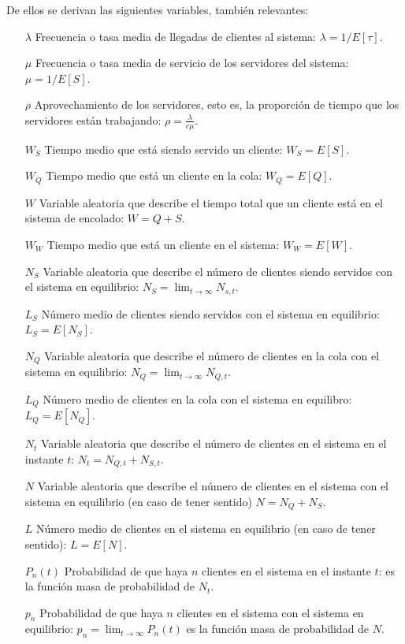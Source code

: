 \documentclass[a4paper,10pt]{scrartcl}
\theoremstyle{definition}
\numberwithin{equation}{section}
\begin{document}

De ellos se derivan las siguientes variables, también relevantes:
\begin{itemize}
\item [$\lambda$]
  Frecuencia o tasa media de llegadas de clientes al sistema: $\lambda = 1/E[\tau]$.
\item [$\mu$]
  Frecuencia o tasa media de servicio de los servidores del sistema: $\mu = 1/E[S]$.
\item [$\rho$]
  Aprovechamiento de los servidores, esto es, la proporción de tiempo que los servidores están trabajando: $\rho = \frac{\lambda}{c\mu}$.
\item [$W_S$]
  Tiempo medio que está siendo servido un cliente: $W_S  = E[S]$.
\item [$W_Q$]
  Tiempo medio que está un cliente en la cola: $W_Q = E[Q]$.
\item [$W$]
  Variable aleatoria que describe el tiempo total que un cliente está en el sistema de encolado: $W = Q+S$.
\item [$W_W$]
  Tiempo medio que está un cliente en el sistema: $W_W = E[W]$.
\item [$N_S$]
  Variable aleatoria que describe el número de clientes siendo servidos con el sistema en equilibrio: $N_S = \lim_{t \rightarrow \infty} N_{s,t}$.
\item [$L_S$]
  Número medio de clientes siendo servidos con el sistema en equilibrio: \\ $L_S = E[N_S]$.
\item [$N_Q$]
  Variable aleatoria que describe el número de clientes en la cola con el sistema en equilibrio: $N_Q = \lim_{t \rightarrow \infty} N_{Q,t}$.
\item [$L_Q$]
  Número medio de clientes en la cola con el sistema en equilibro: $L_Q = E[N_Q]$.
\item [$N_t$]
  Variable aleatoria que describe el número de clientes en el sistema en el instante $t$: $N_t = N_{Q,t} + N_{S,t}$.
\item [$N$]
  Variable aleatoria que describe el número de clientes en el sistema con el sistema en equilibrio (en caso de tener sentido) $N = N_Q + N_S$.
\item [$L$]
  Número medio de clientes en el sistema en equilibrio (en caso de tener sentido): $L = E[N]$.
\item [$P_n(t)$]
  Probabilidad de que haya $n$ clientes en el sistema en el instante $t$: es la función masa de probabilidad de $N_t$.
\item [$p_n$]
  Probabilidad de que haya $n$ clientes en el sistema con el sistema en equilibrio: $p_n = \lim_{t \rightarrow \infty} P_n(t)$ es la función masa de probabilidad de $N$.
\end{itemize}
\end{document}

